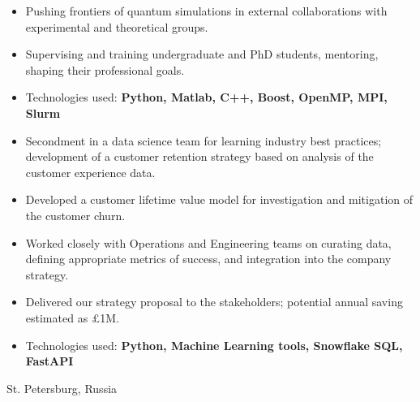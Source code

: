 \documentclass[10pt,a4paper,ragged2e,withhyper]{altacv}
\begin{document}
\begin{paracol}{2}
\begin{itemize}
    \item Pushing frontiers of quantum simulations in external collaborations
    with experimental and theoretical groups.

    \item Supervising and training undergraduate and PhD students, mentoring,
    shaping their professional goals.

    \item Technologies used:
    {\bf Python, Matlab, C++, Boost, OpenMP, MPI, Slurm}
\end{itemize}

\newpage



\begin{itemize}
    \item Secondment in a data science team for learning industry best
    practices;
    development of a customer retention strategy based on analysis of the
    customer experience data.
    
    \item Developed a customer lifetime value model for investigation and
    mitigation of the customer churn.

    \item Worked closely with Operations and Engineering teams on curating data,
    defining appropriate metrics of success, and integration into the company
    strategy.

    \item Delivered our strategy proposal to the stakeholders; 
    potential annual saving estimated as £1M.

    \item Technologies used: 
    {\bf Python, Machine Learning tools, Snowflake SQL, FastAPI}
\end{itemize}

\divider

{St. Petersburg, Russia}


\end{paracol}
\end{document}
